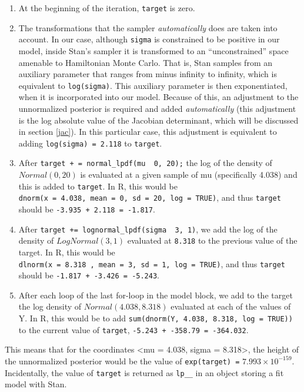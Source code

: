 \documentclass[12pt,]{krantz}
\providecommand{\tightlist}{%
  \setlength{\itemsep}{0pt}\setlength{\parskip}{0pt}}
\theoremstyle{definition}
\theoremstyle{definition}
\theoremstyle{definition}
\theoremstyle{remark}
\begin{document}
\begin{enumerate}
\def\labelenumi{\arabic{enumi}.}
\tightlist
\item
  At the beginning of the iteration, \texttt{target} is zero.
\item
  The transformations that the sampler \emph{automatically} does are taken into account. In our case, although \texttt{sigma} is constrained to be positive in our model, inside Stan's sampler it is transformed to an ``unconstrained'' space amenable to Hamiltonian Monte Carlo. That is, Stan samples from an auxiliary parameter that ranges from minus infinity to infinity, which is equivalent to \texttt{log(sigma)}. This auxiliary parameter is then exponentiated, when it is incorporated into our model. Because of this, an adjustment to the unnormalized posterior is required and added \emph{automatically} (this adjustment is the log absolute value of the Jacobian determinant, which will be discussed in section \ref{jac}). In this particular case, this adjustment is equivalent to adding \texttt{log(sigma)\ =\ 2.118} to \texttt{target}.
\item
  After \texttt{target\ +\ =\ normal\_lpdf(mu\ \textbar{}\ 0,\ 20);} the log of the density of \(Normal(0,20)\) is evaluated at a given sample of mu (specifically 4.038) and this is added to \texttt{target}. In R, this would be \texttt{dnorm(x\ =\ 4.038,\ mean\ =\ 0,\ sd\ =\ 20,\ log\ =\ TRUE)}, and thus \texttt{target} should be \texttt{-3.935\ +\ 2.118\ =\ -1.817}.
\item
  After \texttt{target\ +=\ lognormal\_lpdf(sigma\ \textbar{}\ 3,\ 1)}, we add the log of the density of \(LogNormal(3, 1)\) evaluated at \texttt{8.318} to the previous value of the target. In R, this would be \texttt{dlnorm(x\ =\ 8.318\ ,\ mean\ =\ 3,\ sd\ =\ 1,\ log\ =\ TRUE)}, and thus \texttt{target} should be \texttt{-1.817\ +\ -3.426\ =\ -5.243}.
\item
  After each loop of the last for-loop in the model block, we add to the target the log density of \(Normal( 4.038, 8.318)\) evaluated at each of the values of Y. In R, this would be to add \texttt{sum(dnorm(Y,\ 4.038,\ 8.318,\ log\ =\ TRUE))} to the current value of \texttt{target}, \texttt{-5.243\ +\ -358.79\ =\ -364.032}.
\end{enumerate}

This means that for the coordinates \textless{}mu = 4.038, sigma = 8.318\textgreater{}, the height of the unnormalized posterior would be the value of \texttt{exp(target)\ =} \(\ensuremath{7.993\times 10^{-159}}\). Incidentally, the value of \texttt{target} is returned as \texttt{lp\_\_} in an object storing a fit model with Stan.
\end{document}
